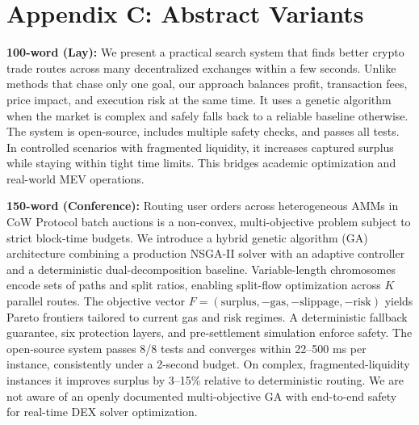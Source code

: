 \documentclass[11pt]{article}
\newcommand{\1}{\mathbf{1}}  %
\begin{document}
\section*{Appendix C: Abstract Variants}
\textbf{100-word (Lay):} We present a practical search system that finds better crypto trade routes across many decentralized exchanges within a few seconds. Unlike methods that chase only one goal, our approach balances profit, transaction fees, price impact, and execution risk at the same time. It uses a genetic algorithm when the market is complex and safely falls back to a reliable baseline otherwise. The system is open-source, includes multiple safety checks, and passes all tests. In controlled scenarios with fragmented liquidity, it increases captured surplus while staying within tight time limits. This bridges academic optimization and real-world MEV operations.

\vspace{0.5em}
\textbf{150-word (Conference):} Routing user orders across heterogeneous AMMs in CoW Protocol batch auctions is a non-convex, multi-objective problem subject to strict block-time budgets. We introduce a hybrid genetic algorithm (GA) architecture combining a production NSGA-II solver with an adaptive controller and a deterministic dual-decomposition baseline. Variable-length chromosomes encode sets of paths and split ratios, enabling split-flow optimization across $K$ parallel routes. The objective vector $F=(\text{surplus},-\text{gas},-\text{slippage},-\text{risk})$ yields Pareto frontiers tailored to current gas and risk regimes. A deterministic fallback guarantee, six protection layers, and pre-settlement simulation enforce safety. The open-source system passes 8/8 tests and converges within 22--500 ms per instance, consistently under a 2-second budget. On complex, fragmented-liquidity instances it improves surplus by 3--15\% relative to deterministic routing. We are not aware of an openly documented multi-objective GA with end-to-end safety for real-time DEX solver optimization.
\end{document}
